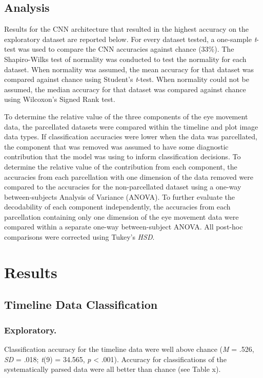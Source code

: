 \documentclass[
  english,
  man]{apa6}
\begin{document}
\subsection{Analysis}

Results for the CNN architecture that resulted in the highest accuracy on the exploratory dataset are reported below. For every dataset tested, a one-sample \emph{t}-test was used to compare the CNN accuracies against chance (33\%). The Shapiro-Wilks test of normality was conducted to test the normality for each dataset. When normality was assumed, the mean accuracy for that dataset was compared against chance using Student's \emph{t}-test. When normality could not be assumed, the median accuracy for that dataset was compared against chance using Wilcoxon's Signed Rank test.

To determine the relative value of the three components of the eye movement data, the parcellated datasets were compared within the timeline and plot image data types. If classification accuracies were lower when the data was parcellated, the component that was removed was assumed to have some diagnostic contribution that the model was using to inform classification decisions. To determine the relative value of the contribution from each component, the accuracies from each parcellation with one dimension of the data removed were compared to the accuracies for the non-parcellated dataset using a one-way between-subjects Analysis of Variance (ANOVA). To further evaluate the decodability of each component independently, the accuracies from each parcellation containing only one dimension of the eye movement data were compared within a separate one-way between-subject ANOVA. All post-hoc comparisons were corrected using Tukey's \emph{HSD}.

\section{Results}

\subsection{Timeline Data Classification}
\subsubsection{Exploratory.}

Classification accuracy for the timeline data were well above chance (\emph{M} = .526, \emph{SD} = .018; \emph{t}(9) = 34.565, \emph{p} \textless{} .001). Accuracy for classifications of the systematically parsed data were all better than chance (see Table x).
\end{document}
